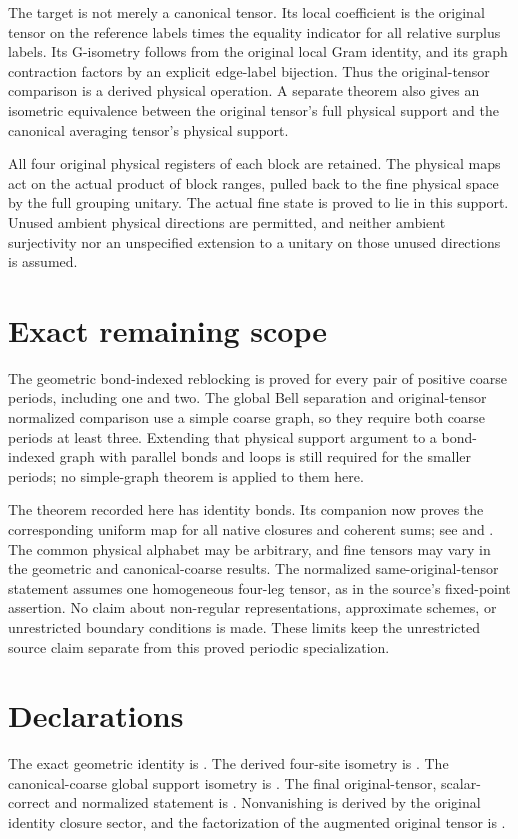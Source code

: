 \documentclass{article}
\begin{document}
The target is not merely a canonical tensor. Its local coefficient is the
original tensor on the reference labels times the equality indicator for
all relative surplus labels. Its G-isometry follows from the original
local Gram identity, and its graph contraction factors by an explicit
edge-label bijection. Thus the original-tensor comparison is a derived
physical operation. A separate theorem also gives an isometric equivalence
between the original tensor's full physical support and the canonical
averaging tensor's physical support.

All four original physical registers of each block are retained. The
physical maps act on the actual product of block ranges, pulled back to
the fine physical space by the full grouping unitary. The actual fine
state is proved to lie in this support. Unused ambient physical directions
are permitted, and neither ambient surjectivity nor an unspecified
extension to a unitary on those unused directions is assumed.

\section{Exact remaining scope}
The geometric bond-indexed reblocking is proved for every pair of positive
coarse periods, including one and two. The global Bell separation and
original-tensor normalized comparison use a simple coarse graph, so they
require both coarse periods at least three. Extending that physical
support argument to a bond-indexed graph with parallel bonds and loops is
still required for the smaller periods; no simple-graph theorem is applied
to them here.

The theorem recorded here has identity bonds. Its companion now proves
the corresponding uniform map for all native closures and coherent sums;
see  and
. The common physical alphabet may be arbitrary,
and fine tensors may vary in the geometric and canonical-coarse results.
The normalized same-original-tensor statement assumes one homogeneous
four-leg tensor, as in the source's fixed-point assertion. No claim about
non-regular representations, approximate schemes, or unrestricted boundary
conditions is made. These limits keep the unrestricted source claim
separate from this proved periodic specialization.

\section{Declarations}
The exact geometric identity is
.
The derived four-site isometry is
.
The canonical-coarse global support isometry is
.
The final original-tensor, scalar-correct and normalized statement is
.
Nonvanishing is derived by the original identity closure sector, and the
factorization of the augmented original tensor is
.
\end{document}
